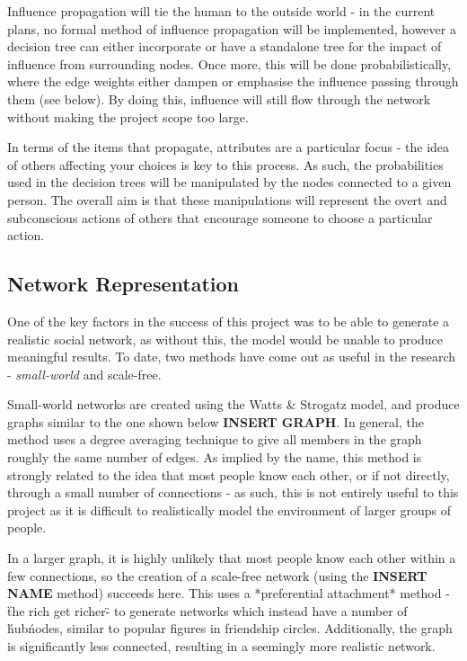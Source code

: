 \documentclass[]{article}
\begin{document}
Influence propagation will tie the human to the outside world - in the current plans, no formal method of influence propagation will be implemented, however a decision tree can either incorporate or have a standalone tree for the impact of influence from surrounding nodes. Once more, this will be done probabilistically, where the edge weights either dampen or emphasise the influence passing through them (see below). By doing this, influence will still flow through the network without making the project scope too large.

In terms of the items that propagate, attributes are a particular focus - the idea of others affecting your choices is key to this process. As such, the probabilities used in the decision trees will be manipulated by the nodes connected to a given person. The overall aim is that these manipulations will represent the overt and subconscious actions of others that encourage someone to choose a particular action.

\subsection{Network Representation}
One of the key factors in the success of this project was to be able to generate a realistic social network, as without this, the model would be unable to produce meaningful results. To date, two methods have come out as useful in the research - \emph{small-world} and {scale-free}.

Small-world networks are created using the Watts & Strogatz model\cite{WSTech}, and produce graphs similar to the one shown below {\bf INSERT GRAPH}. In general, the method uses a degree averaging technique to give all members in the graph roughly the same number of edges. As implied by the name, this method is strongly related to the idea that most people know each other, or if not directly, through a small number of connections - as such, this is not entirely useful to this project as it is difficult to realistically model the environment of larger groups of people. 

In a larger graph, it is highly unlikely that most people know each other within a few connections, so the creation of a scale-free network (using the {\bf INSERT NAME} method) succeeds here. This uses a *preferential attachment* method - \"the rich get richer\" - to generate networks which instead have a number of \'hub\' nodes, similar to popular figures in friendship circles. Additionally, the graph is significantly less connected, resulting in a seemingly more realistic network.
\end{document}
